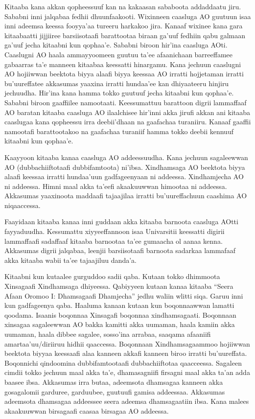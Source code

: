 \documentclass[11pt,b5paper]{book}
\begin{document}
Kitaaba kana akkan qopheessuuf kan na kakaasan sababoota addaddaatu jiru. Sababni inni jalqabaa fedhii dhuunfaakooti. Wixinneen caasluga AO guutuun isaa inni adeemsa keessa
fooyya’aa tureeru harkakoo jira. Kanaaf wixinee kana gara kitaabaatti jijjiiree barsiisotaafi barattootaa biraan ga’uuf fedhiin qabu galmaan ga’uuf jecha kitaabni kun qophaa’e.
Sababni biroon hir’ina caasluga AOti. Caaslugni AO haala ammayyoomeen guutuu ta’ee afaanichaan barreeffamee gabaarras ta’e manneen kitaabaa keessatti hinargamu. Kana
jechuun caaslugni AO hojiiwwan beektota biyya alaafi biyya keessaa AO irratti hojjetaman irratti bu’uureffatee akkasumas yaaxina irratti hundaa’ee kan dhiyaateeru hinjiru jechuudha.
Hir’ina kana hamma tokko guutuuf jecha kitaabni kun qophaa’e. Sababni biroon gaaffiilee namootaati. Keessumattuu barattoon digrii lammaffaaf AO baratan kitaaba caasluga AO ilaalchisee
hir’inni akka jirufi akkan ani kitaaba caaslugaa kana qopheessu irra deebii’dhaan na gaafachaa turaniiru. Kanaaf gaaffii namootafi barattootakoo na gaafachaa turaniif hamma tokko
deebii kennuuf kitaabni kun qophaa’e.

Kaayyoon kitaaba kanaa caasluga AO addeessuudha. Kana jechuun sagaleewwan AO (dubbachiiftotaafi dubbifamtoota) ni’ibsa. Xindhamsaga AO beektota biyya alaafi keessaa irratti
hundaa’uun gadfageenyaan ni addeessa. Xindhamjecha AO ni addeessa. Himni maal akka ta’eefi akaakuuwwan himootaa ni addeessa. Akkasumas yaaxinoota maddaafi tajaajilaa irratti
bu’uureffachuun caashima AO niqaaccessa.

Faayidaan kitaaba kanaa inni guddaan akka kitaaba barnoota caasluga AOtti fayyaduudha. Kessumattu xiyyeeffannoon isaa Univarsitii keessatti digirii lammaffaafi sadaffaaf kitaaba
barnootaa ta’ee gumaacha ol aanaa kenna. Akkasumas digrii jalqabaa, leenjii barsiisotaafi barnoota sadarkaa lammafaaf akka kitaaba wabii ta’ee tajaajiluu danda’a.

Kitaabni kun kutaalee gurguddoo sadii qaba. Kutaan tokko dhimmoota Xinsagaafi Xindhamsaga dhiyeessa. Qabiyyeen kutaan kanaa kitaaba “Seera Afaan Oromoo I: Dhamsagaafi Dhamjecha” jedhu waliin wlitti siqa. Garuu inni kun gadfageenya qaba. Haaluma kanaan kutaan kun boqonnaawwan lamatti qoodama. Isaanis boqonnaa Xinsagafi boqonnaa xindhamsagaati. Boqonnaan xinsagaa sagaleewwan AO bakka kamitti akka uumaman, haala kamiin akka uumaman, haala dibbee sagalee, sosso’ina arrabaa, saaqama afaaniifi amartaa’uu/diriiruu hidhii qaaccessa. Boqonnaan Xindhamsagaammoo hojiiwwan beektota biyyaa keessaafi alaa kanneen akka\cite{lloret1988gemination,griefenow2001grammatical,owens1985grammar,tolemariam2011,wako1981,biniyam1988,kebede1994}fi kanneen biroo irratti bu’uureffata. Boqonnichi qindoomina dubbifamtootaafi
dubbachiiftotaa qaacceessa. Sagaleen cimdii tokko jechuun maal akka ta’e, dhamasagniifi firsagni maal akka ta’an adda baasee ibsa. Akkasumas irra butaa, adeemsota dhamsagaa
kanneen akka gosagalomii garduree, garduubee, guutuufi gamisa addeessaa. Akkasumas adeemsota dhamsagaa addeessee seera adeemsa dhamsagaatiin ibsa. Kana malees
akaakuuwwan birsagaafi caasaa birsagaa AO addeessa.
\end{document}
